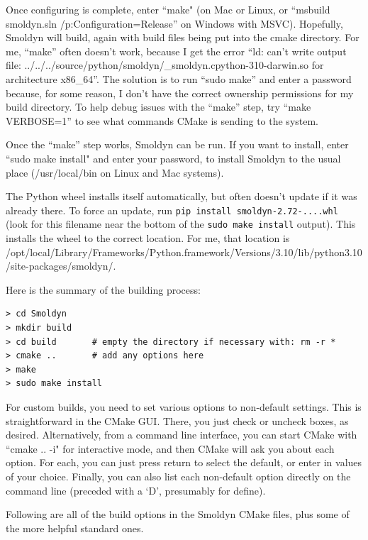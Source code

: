 \documentclass {scrbook}
\newcommand {\ttt} {\texttt}
\begin{document}
Once configuring is complete, enter ``make" (on Mac or Linux, or ``msbuild smoldyn.sln /p:Configuration=Release'' on Windows with MSVC). Hopefully, Smoldyn will build, again with build files being put into the cmake directory. For me, ``make'' often doesn't work, because I get the error ``ld: can't write output file: ../../../source/python/smoldyn/\_smoldyn.cpython-310-darwin.so for architecture x86\_64''. The solution is to run ``sudo make'' and enter a password because, for some reason, I don't have the correct ownership permissions for my build directory. To help debug issues with the ``make'' step, try ``make VERBOSE=1'' to see what commands CMake is sending to the system.

Once the ``make'' step works, Smoldyn can be run. If you want to install, enter ``sudo make install" and enter your password, to install Smoldyn to the usual place (/usr/local/bin on Linux and Mac systems).

The Python wheel installs itself automatically, but often doesn't update if it was already there. To force an update, run \ttt{pip install smoldyn-2.72-....whl} (look for this filename near the bottom of the \ttt{sudo make install} output). This installs the wheel to the correct location. For me, that location is /opt/local/Library/Frameworks/Python.framework/Versions/3.10/lib/\allowbreak python3.10/\allowbreak site-packages/\allowbreak smoldyn/.


Here is the summary of the building process:

\begin{lstlisting}
> cd Smoldyn
> mkdir build
> cd build       # empty the directory if necessary with: rm -r *
> cmake ..	     # add any options here
> make
> sudo make install
\end{lstlisting}

For custom builds, you need to set various options to non-default settings. This is straightforward in the CMake GUI. There, you just check or uncheck boxes, as desired. Alternatively, from a command line interface, you can start CMake with ``cmake .. -i" for interactive mode, and then CMake will ask you about each option. For each, you can just press return to select the default, or enter in values of your choice. Finally, you can also list each non-default option directly on the command line (preceded with a `D', presumably for define).

Following are all of the build options in the Smoldyn CMake files, plus some of the more helpful standard ones.
\end{document}
